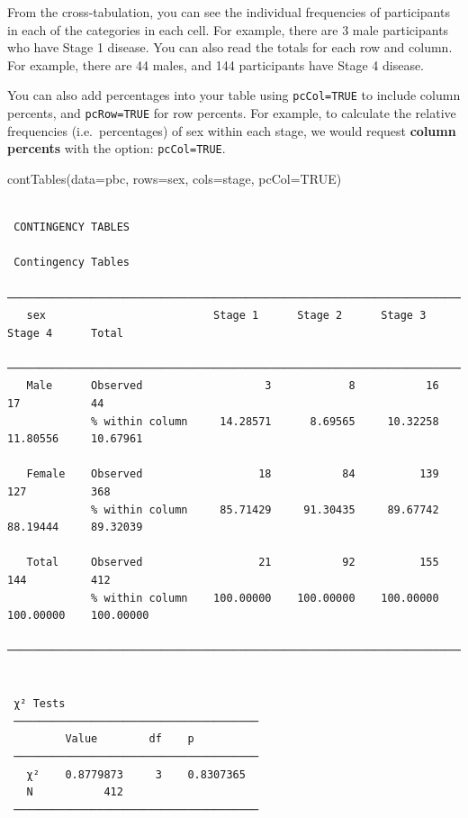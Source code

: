 \documentclass[
  a4paper,
]{memoir}
\newenvironment{Shaded}{\begin{snugshade}}{\end{snugshade}}
\newcommand{\AttributeTok}[1]{\textcolor[rgb]{0.00,0.00,0.00}{#1}}
\newcommand{\ConstantTok}[1]{\textcolor[rgb]{0.00,0.00,0.00}{#1}}
\newcommand{\FunctionTok}[1]{\textcolor[rgb]{0.00,0.00,0.00}{#1}}
\newcommand{\NormalTok}[1]{\textcolor[rgb]{0.00,0.00,0.00}{#1}}
\begin{document}
From the cross-tabulation, you can see the individual frequencies of
participants in each of the categories in each cell. For example, there
are 3 male participants who have Stage 1 disease. You can also read the
totals for each row and column. For example, there are 44 males, and 144
participants have Stage 4 disease.

You can also add percentages into your table using \texttt{pcCol=TRUE}
to include column percents, and \texttt{pcRow=TRUE} for row percents.
For example, to calculate the relative frequencies (i.e.~percentages) of
sex within each stage, we would request \textbf{column percents} with
the option: \texttt{pcCol=TRUE}.

\begin{Shaded}
\begin{Highlighting}[]
\FunctionTok{contTables}\NormalTok{(}\AttributeTok{data=}\NormalTok{pbc, }\AttributeTok{rows=}\NormalTok{sex, }\AttributeTok{cols=}\NormalTok{stage, }\AttributeTok{pcCol=}\ConstantTok{TRUE}\NormalTok{)}
\end{Highlighting}
\end{Shaded}

\begin{verbatim}

 CONTINGENCY TABLES

 Contingency Tables                                                                             
 ────────────────────────────────────────────────────────────────────────────────────────────── 
   sex                          Stage 1      Stage 2      Stage 3      Stage 4      Total       
 ────────────────────────────────────────────────────────────────────────────────────────────── 
   Male      Observed                   3            8           16           17           44   
             % within column     14.28571      8.69565     10.32258     11.80556     10.67961   
                                                                                                
   Female    Observed                  18           84          139          127          368   
             % within column     85.71429     91.30435     89.67742     88.19444     89.32039   
                                                                                                
   Total     Observed                  21           92          155          144          412   
             % within column    100.00000    100.00000    100.00000    100.00000    100.00000   
 ────────────────────────────────────────────────────────────────────────────────────────────── 


 χ² Tests                               
 ────────────────────────────────────── 
         Value        df    p           
 ────────────────────────────────────── 
   χ²    0.8779873     3    0.8307365   
   N           412                      
 ────────────────────────────────────── 
\end{verbatim}
\end{document}
